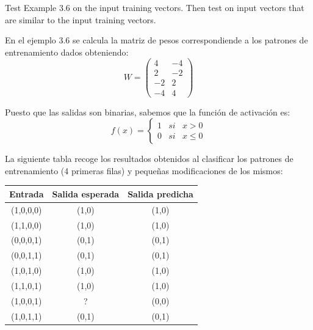 \begin{problem}[4]
Test Example 3.6 on the input training vectors. Then test on input vectors that are
similar to the input training vectors.
\solution


En el ejemplo 3.6 se calcula la matriz de pesos correspondiende a los patrones de entrenamiento dados obteniendo:
\[W = \left( \begin{array}{cc}
4 & -4 \\
2 & -2 \\
-2 & 2 \\
-4 & 4
\end{array}\right)\]

Puesto que las salidas son binarias, sabemos que la función de activación es:
\[f(x) = \left\{ \begin{array}{lll} 1 & si & x>0 \\ 0 & si & x\leq 0 \end{array}\right. \]

La siguiente tabla recoge los resultados obtenidos al clasificar los patrones de entrenamiento (4 primeras filas) y pequeñas modificaciones de los mismos:

\begin{center}
\begin{tabular}{|c|c|c|}
\hline
\textbf{Entrada } & \textbf{Salida esperada} & \textbf{Salida predicha} \\
\hline
(1,0,0,0) & (1,0) & (1,0) \\
(1,1,0,0) & (1,0) & (1,0) \\
(0,0,0,1) & (0,1) & (0,1) \\
(0,0,1,1) & (0,1) & (0,1) \\
(1,0,1,0) & (1,0) & (1,0) \\
(1,1,0,1) & (1,0) & (1,0) \\
(1,0,0,1) & ? & (0,0) \\
(1,0,1,1) & (0,1) & (0,1) \\
\hline
\end{tabular}
\end{center}
\end{problem}

